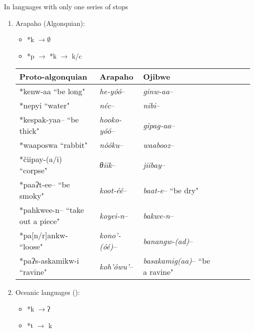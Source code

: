 \documentclass[oldfontcommands,oneside,a4paper,11pt]{article}
\newcommand{\ipa}[1]{{\phon \mbox{#1}}} %
\begin{document}
In languages with only one series of stops 
  \begin{enumerate}
\item   Arapaho (Algonquian):

 \begin{itemize}
\item \ipa{*k} $\rightarrow \emptyset$
\item \ipa{*p} $\rightarrow$ \ipa{*k} $\rightarrow$  \ipa{k/c}
\end{itemize}

 \begin{table}[H]
 \centering  \label{tab:k.zero}
\begin{tabular}{lllllll}
\toprule
Proto-algonquian & Arapaho & Ojibwe \\
\midrule
  \ipa{*kenw-aa} ``be long" & \textit{he-yóó}--    &  \textit{ginw-aa}-- \\
  \ipa{*nepyi} ``water" & \textit{néc}--    &  \textit{nibi}-- \\
 \ipa{*kespak-yaa--} ``be thick" & \textit{hooko-yóó}--    &  \textit{gipag-aa}-- \\
 \ipa{*waaposwa} ``rabbit" & \textit{nóóku}--    &  \textit{waabooz}-- \\
  \ipa{*čiipay-(a/i)} ``corpse" & \textit{θiik}--    &  \textit{jiibay}-- \\
  \ipa{*paaʔt-ee--} ``be smoky" & \textit{koot-éé}--    &  \textit{baat-e}-- ``be dry"\\
    \ipa{*pahkwee-n--} ``take out a piece" & \textit{koyei-n}--    &  \textit{bakwe-n}-- \\
        \ipa{*pa[n/r]ankw-} ``loose" & \textit{kono'-(óé)}--    &  \textit{banangw-(ad)}-- \\ 
   \ipa{*paʔs-askamikw-i} ``ravine" & \textit{koh'ówu'}--    &  \textit{basakamig(aa)}-- ``be a ravine"\\ 
\bottomrule
\end{tabular}
\end{table}

\item Oceanic languages (\citealt{blust04tk}):
 
 \begin{itemize}
\item \ipa{*k} $\rightarrow $\ipa{ʔ}
\item \ipa{*t} $\rightarrow$ \ipa{k}  
\end{itemize} 
 
 \end{enumerate}
 
\end{document}
